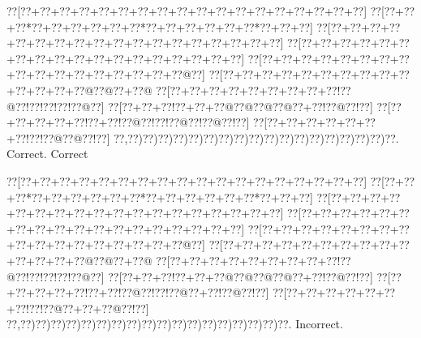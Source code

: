 \documentclass[a5paper]{article}
\begin{document}
\begin{center}
{\goo
\0??[\0??+\0??+\0??+\0??+\0??+\0??+\0??+\0??+\0??+\0??+\0??+\0??+\0??+\0??+\0??+\0??+\0??+\0??]
\0??[\0??+\0??+\0??*\0??+\0??+\0??+\0??+\0??+\0??*\0??+\0??+\0??+\0??+\0??+\0??*\0??+\0??+\0??]
\0??[\0??+\0??+\0??+\0??+\0??+\0??+\0??+\0??+\0??+\0??+\0??+\0??+\0??+\0??+\0??+\0??+\0??+\0??]
\0??[\0??+\0??+\0??+\0??+\0??+\0??+\0??+\0??+\0??+\0??+\0??+\0??+\0??+\0??+\0??+\0??+\0??+\0??]
\0??[\0??+\0??+\0??+\0??+\0??+\0??+\0??+\0??+\0??+\0??+\0??+\0??+\0??+\0??+\0??+\0??+\0??@\0??]
\0??[\0??+\0??+\0??+\0??+\0??+\0??+\0??+\0??+\0??+\0??+\0??+\0??+\0??+\0??@\0??@\0??+\0??@
\0??[\0??+\0??+\0??+\0??+\0??+\0??+\0??+\0??+\0??!\0??@\0??!\0??!\0??!\0??!\0??@\0??]
\0??[\0??+\0??+\0??!\0??+\0??+\0??@\0??@\0??@\0??@\0??+\0??!\0??@\0??!\0??]
\0??[\0??+\0??+\0??+\0??+\0??!\0??+\0??!\0??@\0??!\0??!\0??@\0??!\0??@\0??!\0??]
\0??[\0??+\0??+\0??+\0??+\0??+\0??+\0??!\0??!\0??@\0??@\0??!\0??]
\0??,\0??)\0??)\0??)\0??)\0??)\0??)\0??)\0??)\0??)\0??)\0??)\0??)\0??)\0??)\0??)\0??)\0??)\0??.
}
Correct. Correct

\end{center}
\begin{center}
{\goo
\0??[\0??+\0??+\0??+\0??+\0??+\0??+\0??+\0??+\0??+\0??+\0??+\0??+\0??+\0??+\0??+\0??+\0??+\0??]
\0??[\0??+\0??+\0??*\0??+\0??+\0??+\0??+\0??+\0??*\0??+\0??+\0??+\0??+\0??+\0??*\0??+\0??+\0??]
\0??[\0??+\0??+\0??+\0??+\0??+\0??+\0??+\0??+\0??+\0??+\0??+\0??+\0??+\0??+\0??+\0??+\0??+\0??]
\0??[\0??+\0??+\0??+\0??+\0??+\0??+\0??+\0??+\0??+\0??+\0??+\0??+\0??+\0??+\0??+\0??+\0??+\0??]
\0??[\0??+\0??+\0??+\0??+\0??+\0??+\0??+\0??+\0??+\0??+\0??+\0??+\0??+\0??+\0??+\0??+\0??@\0??]
\0??[\0??+\0??+\0??+\0??+\0??+\0??+\0??+\0??+\0??+\0??+\0??+\0??+\0??+\0??@\0??@\0??+\0??@
\0??[\0??+\0??+\0??+\0??+\0??+\0??+\0??+\0??+\0??!\0??@\0??!\0??!\0??!\0??!\0??@\0??]
\0??[\0??+\0??+\0??!\0??+\0??+\0??@\0??@\0??@\0??@\0??+\0??!\0??@\0??!\0??]
\0??[\0??+\0??+\0??+\0??+\0??!\0??+\0??!\0??@\0??!\0??!\0??@\0??+\0??!\0??@\0??!\0??]
\0??[\0??+\0??+\0??+\0??+\0??+\0??+\0??!\0??!\0??@\0??+\0??+\0??@\0??!\0??]
\0??,\0??)\0??)\0??)\0??)\0??)\0??)\0??)\0??)\0??)\0??)\0??)\0??)\0??)\0??)\0??)\0??)\0??)\0??.
}
Incorrect. 

\end{center}
\end{document}
